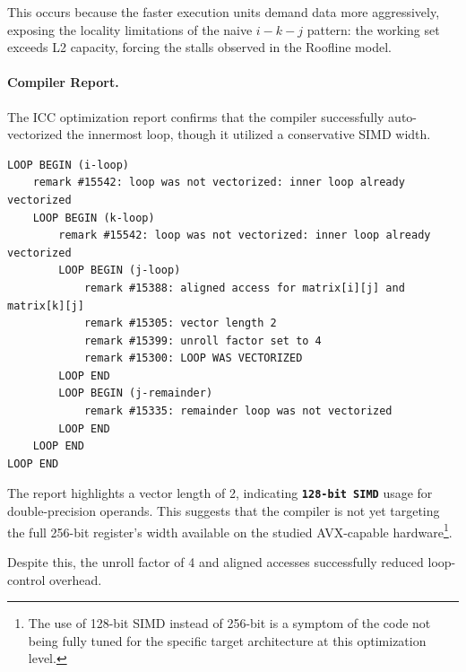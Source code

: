 This occurs because the faster execution units demand data more aggressively, exposing the locality limitations of the naive $i-k-j$ pattern: the working set exceeds L2 capacity, forcing the stalls observed in the Roofline model.

\newpage
\paragraph{Compiler Report.}
The ICC optimization report confirms that the compiler successfully auto-vectorized the innermost loop, though it utilized a conservative SIMD width.

\begin{lstlisting}[style=CStyle, caption={Simplified ICC Optimization Report for \texttt{-O2}.}]
LOOP BEGIN (i-loop)
    remark #15542: loop was not vectorized: inner loop already vectorized
    LOOP BEGIN (k-loop)
        remark #15542: loop was not vectorized: inner loop already vectorized
        LOOP BEGIN (j-loop)
            remark #15388: aligned access for matrix[i][j] and matrix[k][j]
            remark #15305: vector length 2
            remark #15399: unroll factor set to 4
            remark #15300: LOOP WAS VECTORIZED
        LOOP END
        LOOP BEGIN (j-remainder)
            remark #15335: remainder loop was not vectorized
        LOOP END
    LOOP END
LOOP END
\end{lstlisting}

The report highlights a vector length of 2, indicating \texttt{\textbf{128-bit SIMD}} usage for double-precision operands. This suggests that the compiler is not yet targeting the full 256-bit register's width available on the studied AVX-capable hardware\footnote{The use of 128-bit SIMD instead of 256-bit is a symptom of the code not being fully tuned for the specific target architecture at this optimization level.}. 

Despite this, the unroll factor of 4 and aligned accesses successfully reduced loop-control overhead.
